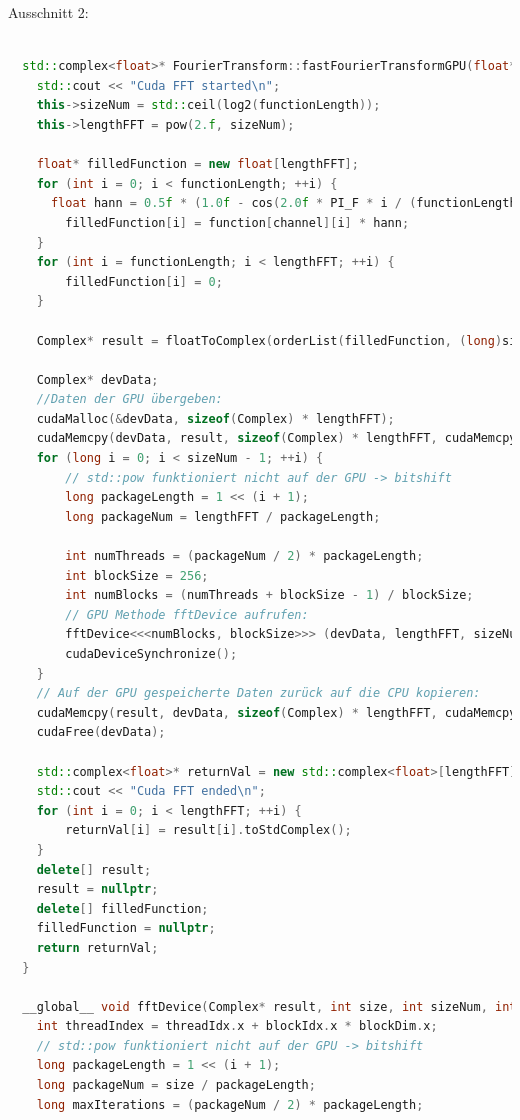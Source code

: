 \documentclass[a4paper,12pt]{article}
\theoremstyle{definition}
\theoremstyle{remark}
\begin{document}
Ausschnitt 2: 
\begin{lstlisting}[style=mystyle, language=C++, caption={FFT auf der GPU mit CUDA}]

  std::complex<float>* FourierTransform::fastFourierTransformGPU(float** function, long functionLength, short channel) {
    std::cout << "Cuda FFT started\n";
    this->sizeNum = std::ceil(log2(functionLength));
    this->lengthFFT = pow(2.f, sizeNum);

    float* filledFunction = new float[lengthFFT];
    for (int i = 0; i < functionLength; ++i) {
      float hann = 0.5f * (1.0f - cos(2.0f * PI_F * i / (functionLength - 1)));
        filledFunction[i] = function[channel][i] * hann;
    }
    for (int i = functionLength; i < lengthFFT; ++i) {
        filledFunction[i] = 0;
    }
    
    Complex* result = floatToComplex(orderList(filledFunction, (long)sizeNum, functionLength), lengthFFT);
    
    Complex* devData;
    //Daten der GPU übergeben: 
    cudaMalloc(&devData, sizeof(Complex) * lengthFFT);
    cudaMemcpy(devData, result, sizeof(Complex) * lengthFFT, cudaMemcpyHostToDevice);
    for (long i = 0; i < sizeNum - 1; ++i) {
        // std::pow funktioniert nicht auf der GPU -> bitshift
        long packageLength = 1 << (i + 1);
        long packageNum = lengthFFT / packageLength;

        int numThreads = (packageNum / 2) * packageLength; 
        int blockSize = 256;
        int numBlocks = (numThreads + blockSize - 1) / blockSize; 
        // GPU Methode fftDevice aufrufen: 
        fftDevice<<<numBlocks, blockSize>>> (devData, lengthFFT, sizeNum, i);
        cudaDeviceSynchronize();
    }
    // Auf der GPU gespeicherte Daten zurück auf die CPU kopieren: 
    cudaMemcpy(result, devData, sizeof(Complex) * lengthFFT, cudaMemcpyDeviceToHost);
    cudaFree(devData);

    std::complex<float>* returnVal = new std::complex<float>[lengthFFT];
    std::cout << "Cuda FFT ended\n";
    for (int i = 0; i < lengthFFT; ++i) {
        returnVal[i] = result[i].toStdComplex();
    }
    delete[] result;
    result = nullptr;
    delete[] filledFunction;
    filledFunction = nullptr;
    return returnVal;
  }

  __global__ void fftDevice(Complex* result, int size, int sizeNum, int i) {
    int threadIndex = threadIdx.x + blockIdx.x * blockDim.x;
    // std::pow funktioniert nicht auf der GPU -> bitshift
    long packageLength = 1 << (i + 1); 
    long packageNum = size / packageLength;
    long maxIterations = (packageNum / 2) * packageLength;
      

\end{lstlisting}
\end{document}
